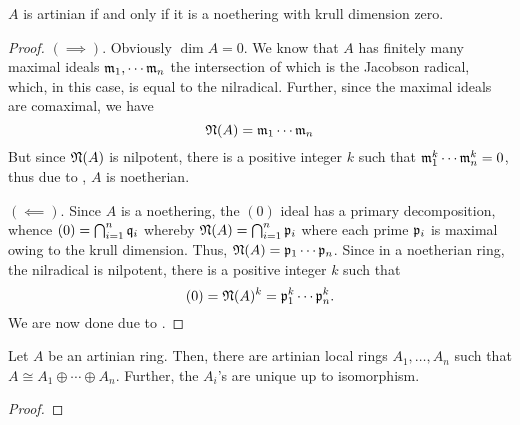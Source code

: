 \begin{theorem}
    $A$ is artinian if and only if it is a noethering with krull dimension zero.
\end{theorem}
\begin{proof}
    $(\implies)$. Obviously $\dim A = 0$. We know that $A$ has finitely many maximal ideals $\mathfrak m_1,\cdots\mathfrak m_n$ the intersection of which is the Jacobson radical, which, in this case, is equal to the nilradical. Further, since the maximal ideals are comaximal, we have 
    \begin{equation*}
        \mathfrak N(A) = \mathfrak m_1\cdots\mathfrak m_n
    \end{equation*}
    But since $\mathfrak N(A)$ is nilpotent, there is a positive integer $k$ such that $\mathfrak m_1^k\cdots\mathfrak m_n^k = 0$, thus due to , $A$ is noetherian.

    $(\impliedby)$. Since $A$ is a noethering, the $(0)$ ideal has a primary decomposition, whence $(0) = \bigcap_{i =  1}^n\mathfrak q_i$ whereby $\mathfrak N(A) = \bigcap_{i = 1}^n\mathfrak p_i$ where each prime $\mathfrak p_i$ is maximal owing to the krull dimension. Thus, $\mathfrak N(A) = \mathfrak p_1\cdots\mathfrak p_n$. Since in a noetherian ring, the nilradical is nilpotent, there is a positive integer $k$ such that 
    \begin{equation*}
        (0) = \mathfrak N(A)^k = \mathfrak p_1^k\cdots\mathfrak p_n^k.
    \end{equation*}
    We are now done due to .
\end{proof}

\begin{theorem}
    Let $A$ be an artinian ring. Then, there are artinian local rings $A_1,\ldots,A_n$ such that $A\cong A_1\oplus\cdots\oplus A_n$. Further, the $A_i$'s are unique up to isomorphism.
\end{theorem}
\begin{proof}
    
\end{proof}

\begin{lemma}
    
\end{lemma}
